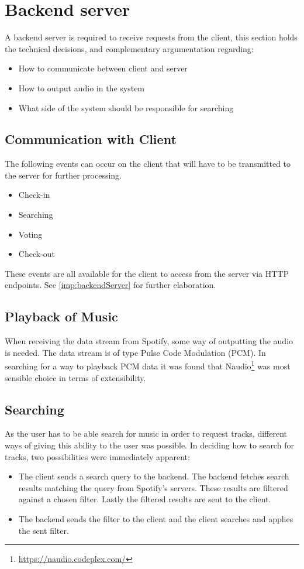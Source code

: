 \section{Backend server}
\label{techPlat:backendServer}

A backend server is required to receive requests from the client, this section holds the technical decisions, and complementary argumentation regarding:
\begin{itemize}
  \item How to communicate between client and server
  \item How to output audio in the system
  \item What side of the system should be responsible for searching
\end{itemize}

\subsection{Communication with Client}
The following events can occur on the client that will have to be
transmitted to the server for further processing.

\begin{itemize}
\item Check-in
\item Searching
\item Voting
\item Check-out
\end{itemize}

These events are all available for the client to access from the server
via HTTP endpoints. See \cref{imp:backendServer} for further elaboration.

\subsection{Playback of Music}
When receiving the data stream from Spotify, some way of outputting the audio is needed. The data stream is of type Pulse Code Modulation (PCM). In searching for a way to playback PCM data it was found that Naudio\footnote{\url{https://naudio.codeplex.com/}} was most sensible choice in terms of extensibility.

\subsection{Searching}
As the user has to be able search for music in order to request tracks, different ways of giving this ability to the user was possible. In deciding how to search for tracks, two possibilities were immediately apparent:
\begin{itemize}
  \item The client sends a search query to the backend. The backend fetches search results matching the query from Spotify's servers. These results are filtered against a chosen filter. Lastly the filtered results are sent to the client.
  \item The backend sends the filter to the client and the client searches and applies the sent filter.
\end{itemize}

